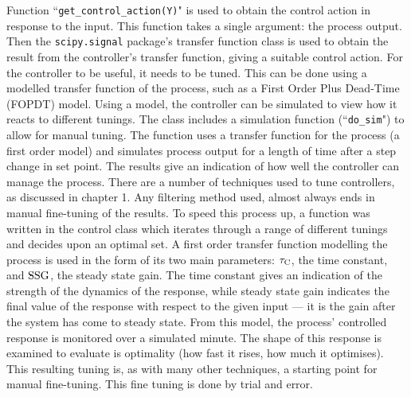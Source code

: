 \documentclass[twoside,a4]{report}
\def\br{\newline \newline \noindent}
\begin{document}
	Function ``\texttt{get\_control\_action(Y)}" is used to obtain the control action in response to the input. This function takes a single argument: the process output. Then the \texttt{scipy.signal} package's transfer function class is used to obtain the result from the controller's transfer function, giving a suitable control action.
	\br
	For the controller to be useful, it needs to be tuned. This can be done using a modelled transfer function of the process, such as a First Order Plus Dead-Time (FOPDT) model. Using a model, the controller can be simulated to view how it reacts to different tunings. The class includes a simulation function (``\texttt{do\_sim}") to allow for manual tuning. The function uses a transfer function for the process (a first order model) and simulates process output for a length of time after a step change in set point. The results give an indication of how well the controller can manage the process. 
	\br
	There are a number of techniques used to tune controllers, as discussed in chapter 1. Any filtering method used, almost always ends in manual fine-tuning of the results. To speed this process up, a function was written in the control class which iterates through a range of different tunings and decides upon an optimal set. A first order transfer function modelling the process is used in the form of its two main parameters: $\rm\tau_C$, the time constant, and $\rm SSG$, the steady state gain. The time constant gives an indication of the strength of the dynamics of the response, while steady state gain indicates the final value of the response with respect to the given input --- it is the gain after the system has come to steady state. From this model, the process' controlled response is monitored over a simulated minute. The shape of this response is examined to evaluate is optimality (how fast it rises, how much it optimises). This resulting tuning is, as with many other techniques, a starting point for manual fine-tuning. This fine tuning is done by trial and error.
	
	
\end{document}
